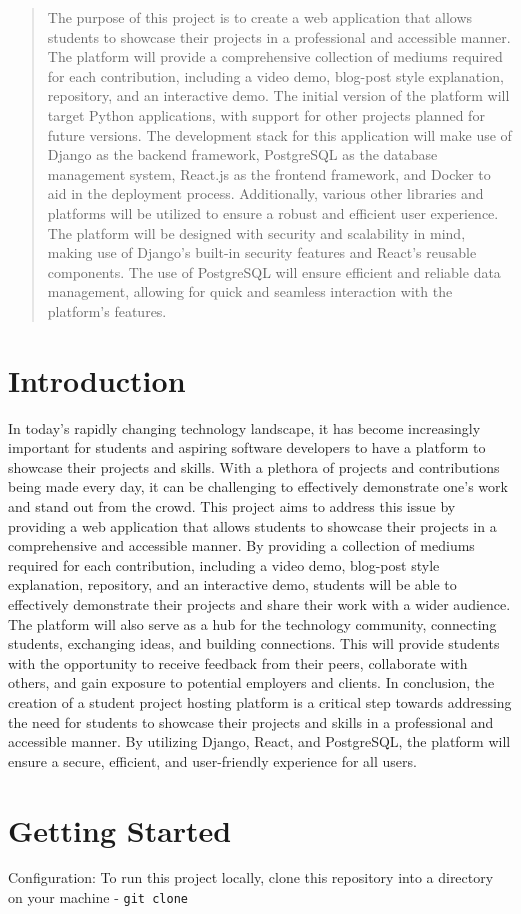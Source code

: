 \documentclass[11pt]{article}
\begin{document}
    
    \tableofcontents
    \begin{abstract}
        The purpose of this project is to create a web application that allows students to showcase their projects in a professional and accessible manner. The platform will provide a comprehensive collection of mediums required for each contribution, including a video demo, blog-post style explanation, repository, and an interactive demo. The initial version of the platform will target Python applications, with support for other projects planned for future versions. The development stack for this application will make use of Django as the backend framework, PostgreSQL as the database management system, React.js as the frontend framework, and Docker to aid in the deployment process. Additionally, various other libraries and platforms will be utilized to ensure a robust and efficient user experience. The platform will be designed with security and scalability in mind, making use of Django's built-in security features and React's reusable components. The use of PostgreSQL will ensure efficient and reliable data management, allowing for quick and seamless interaction with the platform's features.
    \end{abstract}
    \section{Introduction}
    In today's rapidly changing technology landscape, it has become increasingly important for students and aspiring software developers to have a platform to showcase their projects and skills. With a plethora of projects and contributions being made every day, it can be challenging to effectively demonstrate one's work and stand out from the crowd. This project aims to address this issue by providing a web application that allows students to showcase their projects in a comprehensive and accessible manner. By providing a collection of mediums required for each contribution, including a video demo, blog-post style explanation, repository, and an interactive demo, students will be able to effectively demonstrate their projects and share their work with a wider audience. The platform will also serve as a hub for the technology community, connecting students, exchanging ideas, and building connections. This will provide students with the opportunity to receive feedback from their peers, collaborate with others, and gain exposure to potential employers and clients. In conclusion, the creation of a student project hosting platform is a critical step towards addressing the need for students to showcase their projects and skills in a professional and accessible manner. By utilizing Django, React, and PostgreSQL, the platform will ensure a secure, efficient, and user-friendly experience for all users.
    \section{Getting Started}
    Configuration:
    To run this project locally, clone this repository into a directory on your machine
    - \verb|git clone |
\end{document}

